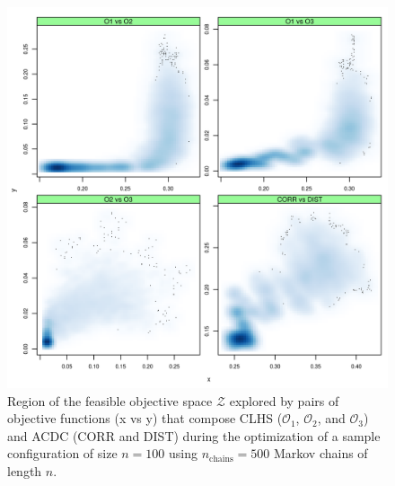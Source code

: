 \begin{figure}[!ht]
 \centering
 \includegraphics[width=\textwidth]{fig/chap07-energy_acdc_clhs}
 \caption[Region of the feasible objective space explored by pairs of objective functions that compose CLHS 
 and ACDC.]{Region of the feasible objective space $\mathcal{Z}$ explored by pairs of objective functions (x 
 vs  y) that compose CLHS ($\mathcal{O}_1$, $\mathcal{O}_2$, and $\mathcal{O}_3$) and ACDC (CORR and DIST)  
 during the optimization of a sample configuration of size $n = 100$ using $n_{\text{chains}} = 500$ Markov 
 chains of length $n$.}
 \label{fig:chap07-energy-acdc-clhs}
\end{figure}

